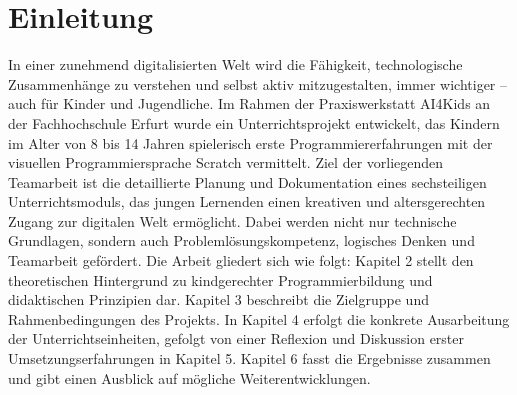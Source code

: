 \chapter{Einleitung}
\label{sec:Einleitung}
In einer zunehmend digitalisierten Welt wird die Fähigkeit, technologische Zusammenhänge zu verstehen und selbst aktiv mitzugestalten, immer wichtiger – auch für Kinder und Jugendliche. Im Rahmen der Praxiswerkstatt AI4Kids an der Fachhochschule Erfurt wurde ein Unterrichtsprojekt entwickelt, das Kindern im Alter von 8 bis 14 Jahren spielerisch erste Programmiererfahrungen mit der visuellen Programmiersprache Scratch vermittelt.
Ziel der vorliegenden Teamarbeit ist die detaillierte Planung und Dokumentation eines sechsteiligen Unterrichtsmoduls, das jungen Lernenden einen kreativen und altersgerechten Zugang zur digitalen Welt ermöglicht. Dabei werden nicht nur technische Grundlagen, sondern auch Problemlösungskompetenz, logisches Denken und Teamarbeit gefördert.
Die Arbeit gliedert sich wie folgt: Kapitel 2 stellt den theoretischen Hintergrund zu kindgerechter Programmierbildung und didaktischen Prinzipien dar. Kapitel 3 beschreibt die Zielgruppe und Rahmenbedingungen des Projekts. In Kapitel 4 erfolgt die konkrete Ausarbeitung der Unterrichtseinheiten, gefolgt von einer Reflexion und Diskussion erster Umsetzungserfahrungen in Kapitel 5. Kapitel 6 fasst die Ergebnisse zusammen und gibt einen Ausblick auf mögliche Weiterentwicklungen.
